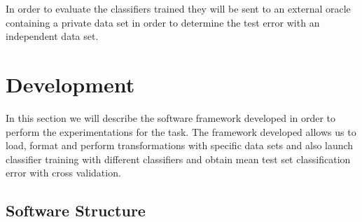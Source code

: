 \documentclass[a4paper,10pt,titlepage]{article}
\begin{document}
\par In order to evaluate the classifiers trained they will be sent to an external oracle containing a private data set in order to determine the test error with an independent data set.  

\section{Development}

\par In this section we will describe the software framework developed in order to perform the experimentations for the task. The framework developed allows us to load, format and perform transformations with specific data sets and also launch classifier training with different classifiers and obtain mean test set classification error with cross validation. 

\subsection{Software Structure}
\end{document}
